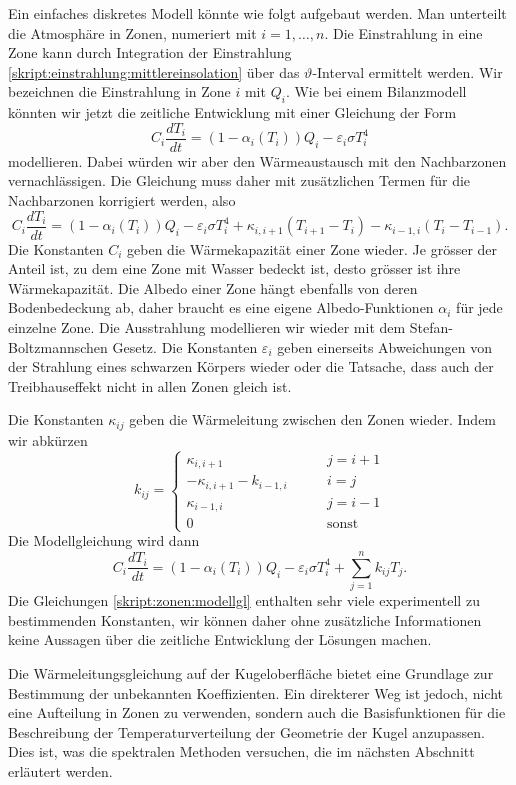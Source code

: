Ein einfaches diskretes Modell könnte wie folgt aufgebaut werden.
Man unterteilt die Atmosphäre in Zonen, numeriert mit $i=1,\dots,n$.
Die Einstrahlung in eine Zone kann durch Integration der Einstrahlung
\eqref{skript:einstrahlung:mittlereinsolation}
über das $\vartheta$-Interval ermittelt werden.
Wir bezeichnen die Einstrahlung in Zone $i$ mit $Q_i$.
Wie bei einem Bilanzmodell könnten wir jetzt die zeitliche
Entwicklung mit einer Gleichung der Form
\[
C_i\frac{dT_i}{dt}
=
(1-\alpha_i(T_i)) Q_i - \varepsilon_i \sigma T_i^4
\]
modellieren.
Dabei würden wir aber den Wärmeaustausch mit den Nachbarzonen
vernachlässigen.
Die Gleichung muss daher mit zusätzlichen Termen für die Nachbarzonen
korrigiert werden, also
\begin{equation}
C_i\frac{dT_i}{dt}
=
(1-\alpha_i(T_i)) Q_i - \varepsilon_i \sigma T_i^4
+
\kappa_{i,i+1} (T_{i+1}-T_i)
-
\kappa_{i-1,i} (T_i-T_{i-1}).
\end{equation}
Die Konstanten $C_i$ geben die Wärmekapazität einer Zone wieder.
Je grösser der Anteil ist, zu dem eine Zone mit Wasser bedeckt ist,
desto grösser ist ihre Wärmekapazität.
Die Albedo einer Zone hängt ebenfalls von deren Bodenbedeckung ab, 
daher braucht es eine eigene Albedo-Funktionen $\alpha_i$ für jede
einzelne Zone.
Die Ausstrahlung modellieren wir wieder mit dem Stefan-Boltzmannschen
Gesetz.
Die Konstanten $\varepsilon_i$ geben einerseits Abweichungen von
der Strahlung eines schwarzen Körpers wieder oder die Tatsache, dass
auch der Treibhauseffekt nicht in allen Zonen gleich ist.

Die Konstanten $\kappa_{ij}$ geben die Wärmeleitung zwischen den
Zonen wieder.
Indem wir abkürzen
\[
k_{ij}
=
\begin{cases}
\kappa_{i,i+1}&\qquad j=i+1
\\
-\kappa_{i,i+1}-k_{i-1,i}&\qquad i=j
\\
\kappa_{i-1,i}&\qquad j=i-1
\\
0&\qquad\text{sonst}
\end{cases}
\]
Die Modellgleichung wird dann
\begin{equation}
C_i \frac{dT_i}{dt}
=
(1-\alpha_i(T_i)) Q_i - \varepsilon_i \sigma T_i^4
+
\sum_{j=1}^n k_{ij}T_j.
\label{skript:zonen:modellgl}
\end{equation}
Die Gleichungen
\eqref{skript:zonen:modellgl}
enthalten sehr viele experimentell zu bestimmenden Konstanten,
wir können daher ohne zusätzliche Informationen keine Aussagen
über die zeitliche Entwicklung der Lösungen machen.

Die Wärmeleitungsgleichung auf der Kugeloberfläche bietet eine
Grundlage zur Bestimmung der unbekannten Koeffizienten.
Ein direkterer Weg ist jedoch, nicht eine Aufteilung in Zonen
zu verwenden, sondern auch die Basisfunktionen für die Beschreibung
der Temperaturverteilung der Geometrie der Kugel anzupassen.
Dies ist, was die spektralen Methoden versuchen, die im nächsten
Abschnitt erläutert werden.

